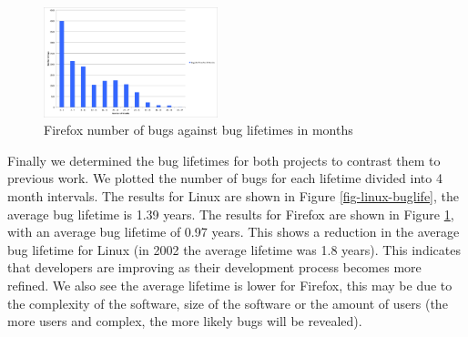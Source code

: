 \begin{figure}
\begin{center}
\includegraphics[width=0.45\textwidth]{firefox_bug_life.png}
\end{center}
\caption{Firefox number of bugs against bug lifetimes in months}
\label{fig-firefox-buglife}
\end{figure}

Finally we determined the bug lifetimes for both projects to contrast
them to previous work. We plotted the number of bugs for each lifetime
divided into 4 month intervals. The results for Linux are shown in
Figure \ref{fig-linux-buglife}, the average bug lifetime is 1.39
years. The results for Firefox are shown in Figure
\ref{fig-firefox-buglife}, with an average bug lifetime of 0.97
years. This shows a reduction in the average bug lifetime for Linux (in
2002 the average lifetime was 1.8 years). This indicates that
developers are improving as their development process becomes more
refined. We also see the average lifetime is lower for Firefox, this
may be due to the complexity of the software, size of the software or
the amount of users (the more users and complex, the more likely bugs will be
revealed).
